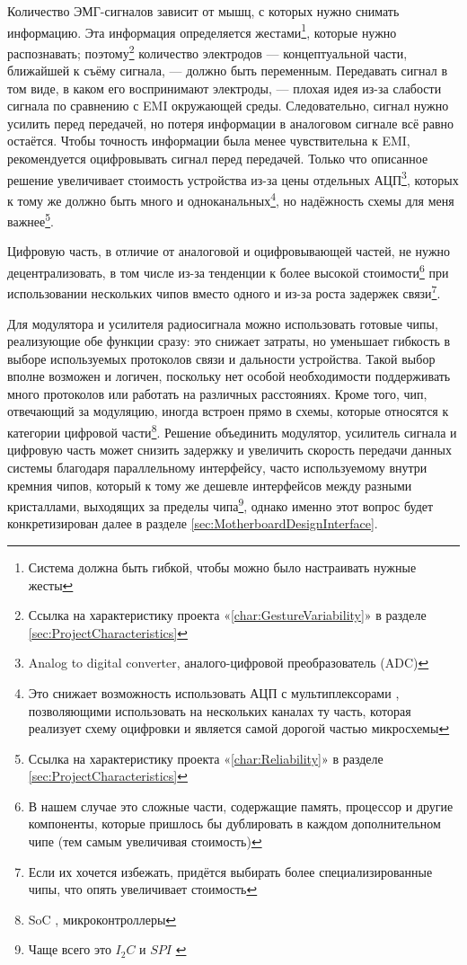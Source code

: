 \documentclass[a4paper, 10pt, final]{article} %
\newcommand{\parenciteit}[2]{\textit{\parencite[#1]{#2}}} %
\begin{document}
    Количество ЭМГ-сигналов зависит от мышц, с которых нужно снимать информацию.
    Эта информация определяется жестами\footnote{Система должна быть гибкой, чтобы можно было настраивать нужные жесты}, которые нужно распознавать; поэтому\footnote{Ссылка на характеристику проекта «\ref{char:GestureVariability}» в разделе \ref{sec:ProjectCharacteristics}} количество электродов --- концептуальной части, ближайшей к съёму сигнала, --- должно быть переменным.
    Передавать сигнал в том виде, в каком его воспринимают электроды, --- плохая идея из-за слабости сигнала по сравнению с EMI окружающей среды.
    Следовательно, сигнал нужно усилить перед передачей, но потеря информации в аналоговом сигнале всё равно остаётся.
    Чтобы точность информации была менее чувствительна к EMI, рекомендуется оцифровывать сигнал перед передачей.
    Только что описанное решение увеличивает стоимость устройства из-за цены отдельных АЦП\footnote{Analog to digital converter, аналого-цифровой преобразователь (ADC)}, которых к тому же должно быть много и одноканальных\footnote{Это снижает возможность использовать АЦП с мультиплексорами \parenciteit{}{Multiplexer:Wiki}, позволяющими использовать на нескольких каналах ту часть, которая реализует схему оцифровки и является самой дорогой частью микросхемы}, но надёжность схемы для меня важнее\footnote{Ссылка на характеристику проекта «\ref{char:Reliability}» в разделе \ref{sec:ProjectCharacteristics}}.

    Цифровую часть, в отличие от аналоговой и оцифровывающей частей, не нужно децентрализовать, в том числе из-за тенденции к более высокой стоимости\footnote{В нашем случае это сложные части, содержащие память, процессор и другие компоненты, которые пришлось бы дублировать в каждом дополнительном чипе (тем самым увеличивая стоимость)} при использовании нескольких чипов вместо одного и из-за роста задержек связи\footnote{Если их хочется избежать, придётся выбирать более специализированные чипы, что опять увеличивает стоимость}.

    Для модулятора и усилителя радиосигнала можно использовать готовые чипы, реализующие обе функции сразу: это снижает затраты, но уменьшает гибкость в выборе используемых протоколов связи и дальности устройства.
    Такой выбор вполне возможен и логичен, поскольку нет особой необходимости поддерживать много протоколов или работать на различных расстояниях.
    Кроме того, чип, отвечающий за модуляцию, иногда встроен прямо в схемы, которые относятся к категории цифровой части\footnote{SoC \parenciteit{}{SoC:Wiki}, микроконтроллеры}.
    Решение объединить модулятор, усилитель сигнала и цифровую часть может снизить задержку и увеличить скорость передачи данных системы благодаря параллельному интерфейсу, часто используемому внутри кремния чипов, который к тому же дешевле интерфейсов между разными кристаллами, выходящих за пределы чипа\footnote{Чаще всего это $I_2 C$ \parenciteit{}{I2C:Wiki} и $SPI$ \parenciteit{}{SPI:Wiki}}, однако именно этот вопрос будет конкретизирован далее в разделе \ref{sec:MotherboardDesignInterface}.
\end{document}
